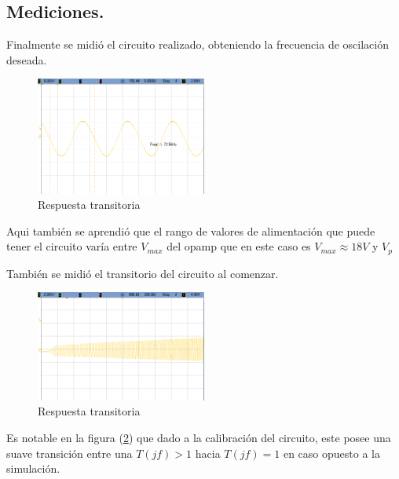\subsection{Mediciones.}
Finalmente se midió el circuito realizado, obteniendo la frecuencia de oscilación deseada.
\begin{figure}[H]
	\centering
	\includegraphics[width=0.5\textwidth]{Imagenes-Ej1/oscilador.png}
	\caption{Respuesta transitoria}
	\label{fig:trans}
\end{figure}
Aqui también se aprendió que el rango de valores de alimentación que puede tener el circuito varía entre $V_{max}$ del opamp que en este caso es $V_{max}\approx 18V$ y $V_p$

También se midió el transitorio del circuito al comenzar.
\begin{figure}[H]
	\centering
	\includegraphics[width=0.5\textwidth]{Imagenes-Ej1/osciladorstep.png}
	\caption{Respuesta transitoria}
	\label{fig:transStep}
\end{figure}
Es notable en la figura (\ref{fig:transStep}) que dado a la calibración del circuito, este posee una suave transición entre una $T(jf)>1$ hacia $T(jf) = 1$ en caso opuesto a la simulación.


